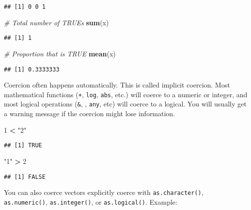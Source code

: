 \documentclass[
]{book}
\newenvironment{Shaded}{\begin{snugshade}}{\end{snugshade}}
\newcommand{\CommentTok}[1]{\textcolor[rgb]{0.56,0.35,0.01}{\textit{#1}}}
\newcommand{\DecValTok}[1]{\textcolor[rgb]{0.00,0.00,0.81}{#1}}
\newcommand{\KeywordTok}[1]{\textcolor[rgb]{0.13,0.29,0.53}{\textbf{#1}}}
\newcommand{\NormalTok}[1]{#1}
\newcommand{\OperatorTok}[1]{\textcolor[rgb]{0.81,0.36,0.00}{\textbf{#1}}}
\newcommand{\StringTok}[1]{\textcolor[rgb]{0.31,0.60,0.02}{#1}}
\begin{document}
\begin{verbatim}
## [1] 0 0 1
\end{verbatim}

\begin{Shaded}
\begin{Highlighting}[]
\CommentTok{\# Total number of TRUEs}
\KeywordTok{sum}\NormalTok{(x)}
\end{Highlighting}
\end{Shaded}

\begin{verbatim}
## [1] 1
\end{verbatim}

\begin{Shaded}
\begin{Highlighting}[]
\CommentTok{\# Proportion that is TRUE}
\KeywordTok{mean}\NormalTok{(x)}
\end{Highlighting}
\end{Shaded}

\begin{verbatim}
## [1] 0.3333333
\end{verbatim}

Coercion often happens automatically. This is called implicit coercion. Most mathematical functions (\texttt{+}, \texttt{log}, \texttt{abs}, etc.) will coerce to a numeric or integer, and most logical operations (\texttt{\&}, \texttt{\textbar{}}, \texttt{any}, etc) will coerce to a logical. You will usually get a warning message if the coercion might lose information.

\begin{Shaded}
\begin{Highlighting}[]
\DecValTok{1} \OperatorTok{\textless{}}\StringTok{ "2"}
\end{Highlighting}
\end{Shaded}

\begin{verbatim}
## [1] TRUE
\end{verbatim}

\begin{Shaded}
\begin{Highlighting}[]
\StringTok{"1"} \OperatorTok{\textgreater{}}\StringTok{ }\DecValTok{2}
\end{Highlighting}
\end{Shaded}

\begin{verbatim}
## [1] FALSE
\end{verbatim}

You can also coerce vectors explicitly coerce with \texttt{as.character()}, \texttt{as.numeric()}, \texttt{as.integer()}, or \texttt{as.logical()}. Example:
\end{document}
